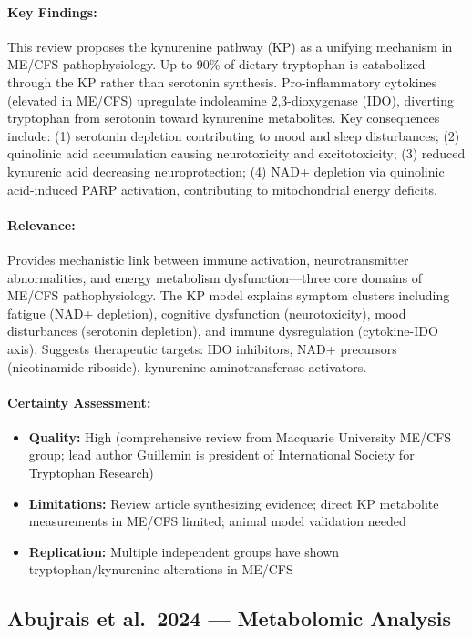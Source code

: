 \paragraph{Key Findings:}
This review proposes the kynurenine pathway (KP) as a unifying mechanism in ME/CFS pathophysiology. Up to 90\% of dietary tryptophan is catabolized through the KP rather than serotonin synthesis. Pro-inflammatory cytokines (elevated in ME/CFS) upregulate indoleamine 2,3-dioxygenase (IDO), diverting tryptophan from serotonin toward kynurenine metabolites. Key consequences include: (1) serotonin depletion contributing to mood and sleep disturbances; (2) quinolinic acid accumulation causing neurotoxicity and excitotoxicity; (3) reduced kynurenic acid decreasing neuroprotection; (4) NAD+ depletion via quinolinic acid-induced PARP activation, contributing to mitochondrial energy deficits.

\paragraph{Relevance:}
Provides mechanistic link between immune activation, neurotransmitter abnormalities, and energy metabolism dysfunction---three core domains of ME/CFS pathophysiology. The KP model explains symptom clusters including fatigue (NAD+ depletion), cognitive dysfunction (neurotoxicity), mood disturbances (serotonin depletion), and immune dysregulation (cytokine-IDO axis). Suggests therapeutic targets: IDO inhibitors, NAD+ precursors (nicotinamide riboside), kynurenine aminotransferase activators.

\paragraph{Certainty Assessment:}
\begin{itemize}
    \item \textbf{Quality:} High (comprehensive review from Macquarie University ME/CFS group; lead author Guillemin is president of International Society for Tryptophan Research)
    \item \textbf{Limitations:} Review article synthesizing evidence; direct KP metabolite measurements in ME/CFS limited; animal model validation needed
    \item \textbf{Replication:} Multiple independent groups have shown tryptophan/kynurenine alterations in ME/CFS
\end{itemize}

\subsection{Abujrais et al.\ 2024 --- Metabolomic Analysis}

